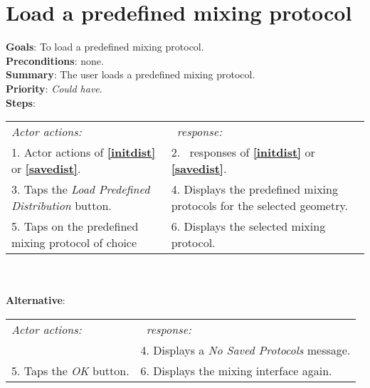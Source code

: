   \section{Load a predefined mixing protocol}
  \label{loadpredprot}
  \textbf{Goals}: To load a predefined mixing protocol.\\
  \textbf{Preconditions}: none.\\
  \textbf{Summary}: The user loads a predefined mixing protocol.\\
  \textbf{Priority}: \emph{Could have}.\\
  \textbf{Steps}: \\
  \begin{tabular}{ p{} p{} }
  	\emph{Actor actions:} & \emph{\projectname\ response:} \\
  	1. Actor actions of \textbf{\ref{initdist}} or  \textbf{\ref{savedist}}. & 2. \projectname\ responses of \textbf{\ref{initdist}} or  \textbf{\ref{savedist}}. \\
	3. Taps the \emph{Load Predefined Distribution} button. & 4. Displays the predefined mixing protocols for the selected geometry. \\
	5. Taps on the predefined mixing protocol of choice & 6. Displays the selected mixing protocol. \\
  \end{tabular}
  	 \\
     \\\textbf{Alternative}: \\
    \begin{tabular}{ p{} p{} }
  	\emph{Actor actions:} & \emph{\projectname\ response:} \\
            & 4. Displays a \emph{No Saved Protocols} message. \\
    5. Taps the \emph{OK} button. & 6. Displays the mixing interface again. \\
  \end{tabular}
  
